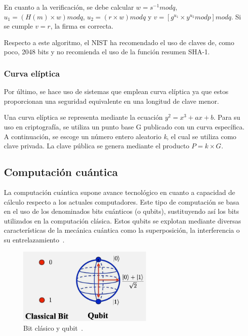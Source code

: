 En cuanto a la verificación, se debe calcular $w = s^{-1} mod q$, $u_1 = (H(m)\times w) mod q$, $u_2 = (r\times w) mod q$ y $v = [g^{u_1}\times y^{u_2} mod p] mod q$.
Si se cumple $v = r$, la firma es correcta.

Respecto a este algoritmo, el \ac{NIST} ha recomendado el uso de claves de, como poco, 2048 bits y no recomienda el uso de la función resumen SHA-1.


\subsubsection{Curva elíptica}\label{subsubsec:eliptica}

Por último, se hace uso de sistemas que emplean curva elíptica ya que estos proporcionan una seguridad equivalente en una longitud de clave menor.

Una curva elíptica se representa mediante la ecuación $y^2 = x^3 + ax + b$.
Para su uso en criptografía, se utiliza un punto base G publicado con un curva específica.
A continuación, se escoge un número entero aleatorio \textit{k}, el cual se utiliza como clave privada.
La clave pública se genera mediante el producto $P = k\times G$.


\subsection{Computación cuántica}\label{subsec:cuantica}

La computación cuántica supone avance tecnológico en cuanto a capacidad de cálculo respecto a los actuales computadores.
Este tipo de computación se basa en el uso de los denominados bits cuánticos (o qubits), sustituyendo así los bits utilizados en la computación clásica.
Estos qubits se explotan mediante diversas características de la mecánica cuántica como la superposición, la interferencia o su entrelazamiento~\cite{Rietsche2022}.

\begin{figure}[h]
    \centering
    \includegraphics[width=0.6\textwidth]{figures/qubit.png}
    \caption{Bit clásico y qubit~\cite{Rietsche2022}.}
    \label{fig:qubit}
\end{figure}

